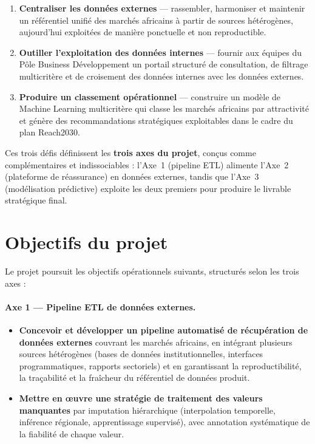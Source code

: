 \documentclass[12pt,a4paper]{report}
\begin{document}
\begin{enumerate}[leftmargin=1.5cm, itemsep=4pt]
  \item \textbf{Centraliser les données externes} --- rassembler, harmoniser et maintenir un référentiel unifié des marchés africains à partir de sources hétérogènes, aujourd'hui exploitées de manière ponctuelle et non reproductible.
  \item \textbf{Outiller l'exploitation des données internes} --- fournir aux équipes du Pôle Business Développement un portail structuré de consultation, de filtrage multicritère et de croisement des données internes avec les données externes.
  \item \textbf{Produire un classement opérationnel} --- construire un modèle de Machine Learning multicritère qui classe les marchés africains par attractivité et génère des recommandations stratégiques exploitables dans le cadre du plan Reach2030.
\end{enumerate}

Ces trois défis définissent les \textbf{trois axes du projet}, conçus comme complémentaires et indissociables : l'Axe~1 (pipeline ETL) alimente l'Axe~2 (plateforme de réassurance) en données externes, tandis que l'Axe~3 (modélisation prédictive) exploite les deux premiers pour produire le livrable stratégique final.

\section{Objectifs du projet}

Le projet poursuit les objectifs opérationnels suivants, structurés selon les trois axes :

\paragraph{Axe 1 --- Pipeline ETL de données externes.}
\begin{itemize}[leftmargin=1.5cm, itemsep=6pt]
  \item \textbf{Concevoir et développer un pipeline automatisé de récupération de données externes} couvrant les marchés africains, en intégrant plusieurs sources hétérogènes (bases de données institutionnelles, interfaces programmatiques, rapports sectoriels) et en garantissant la reproductibilité, la traçabilité et la fraîcheur du référentiel de données produit.
  \item \textbf{Mettre en œuvre une stratégie de traitement des valeurs manquantes} par imputation hiérarchique (interpolation temporelle, inférence régionale, apprentissage supervisé), avec annotation systématique de la fiabilité de chaque valeur.
\end{itemize}
\end{document}
